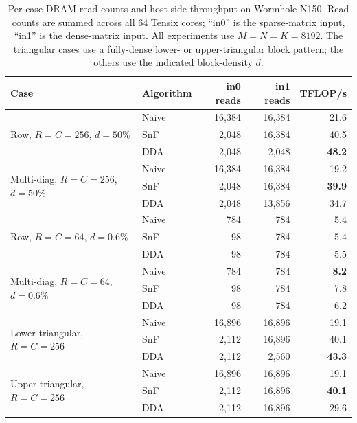 %

\begin{table}[t]
\centering
\caption{Per-case DRAM read counts and host-side throughput on Wormhole N150.
Read counts are summed across all 64 Tensix cores; ``in0'' is the sparse-matrix
input, ``in1'' is the dense-matrix input. All experiments use $M=N=K=8192$.
The triangular cases use a fully-dense lower- or upper-triangular block
pattern; the others use the indicated block-density $d$.}
\label{tab:dda-vs-snf-dram-reads}
\begin{tabular}{llrrr}
\toprule
Case & Algorithm & in0 reads & in1 reads & TFLOP/s \\
\midrule
\multirow{3}{*}{Row, $R{=}C{=}256$, $d{=}50\%$}
  & Naive & 16{,}384 & 16{,}384 & 21.6 \\
  & SnF   & 2{,}048  & 16{,}384 & 40.5 \\
  & DDA   & 2{,}048  & 2{,}048  & \textbf{48.2} \\
\midrule
\multirow{3}{*}{Multi-diag, $R{=}C{=}256$, $d{=}50\%$}
  & Naive & 16{,}384 & 16{,}384 & 19.2 \\
  & SnF   & 2{,}048  & 16{,}384 & \textbf{39.9} \\
  & DDA   & 2{,}048  & 13{,}856 & 34.7 \\
\midrule
\multirow{3}{*}{Row, $R{=}C{=}64$, $d{=}0.6\%$}
  & Naive & 784 & 784 & 5.4 \\
  & SnF   & 98  & 784 & 5.4 \\
  & DDA   & 98  & 784 & 5.5 \\
\midrule
\multirow{3}{*}{Multi-diag, $R{=}C{=}64$, $d{=}0.6\%$}
  & Naive & 784 & 784 & \textbf{8.2} \\
  & SnF   & 98  & 784 & 7.8 \\
  & DDA   & 98  & 784 & 6.2 \\
\midrule
\multirow{3}{*}{Lower-triangular, $R{=}C{=}256$}
  & Naive & 16{,}896 & 16{,}896 & 19.1 \\
  & SnF   & 2{,}112  & 16{,}896 & 40.1 \\
  & DDA   & 2{,}112  & 2{,}560  & \textbf{43.3} \\
\midrule
\multirow{3}{*}{Upper-triangular, $R{=}C{=}256$}
  & Naive & 16{,}896 & 16{,}896 & 19.1 \\
  & SnF   & 2{,}112  & 16{,}896 & \textbf{40.1} \\
  & DDA   & 2{,}112  & 16{,}896 & 29.6 \\
\bottomrule
\end{tabular}
\end{table}
